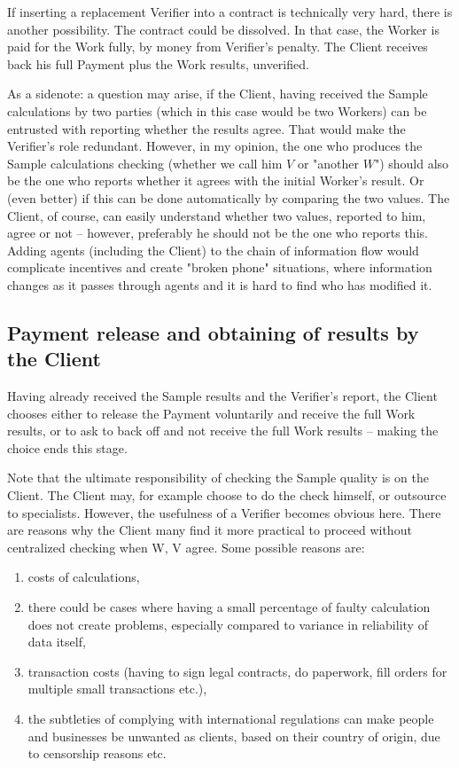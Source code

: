 \documentclass{article}
\providecommand{\tightlist}{%
  \setlength{\itemsep}{0pt}%
  \setlength{\parskip}{0pt}%
  \setlength{\topsep}{0pt}}
\begin{document}
If inserting a replacement Verifier into a contract is technically very hard, there is another possibility. The contract could be dissolved. In that case, the Worker is paid for the Work fully, by money from Verifier's penalty. The Client receives back his full Payment plus the Work results, unverified. 

As a sidenote: a question may arise, if the Client, having received the Sample calculations by two parties (which in this case would be two Workers) can be entrusted with reporting whether the results agree. That would make the Verifier's role redundant. However, in my opinion, the one who produces the Sample calculations checking (whether we call him $V$ or "another $W$") should also be the one who reports whether it agrees with the initial Worker's result. Or (even better) if this can be done automatically by comparing the two values. The Client, of course, can easily understand whether two values, reported to him, agree or not – however, preferably he should not be the one who reports this. Adding agents (including the Client) to the chain of information flow would complicate incentives and create "broken phone" situations, where information changes as it passes through agents and it is hard to find who has modified it.

\subsection{Payment release and obtaining of results by the Client}
\label{results}

Having already received the Sample results and the Verifier's report, the Client chooses either to release the Payment voluntarily and receive the full Work results, or to ask to back off and not receive the full Work results – making the choice ends this stage. 

Note that the ultimate responsibility of checking the Sample quality is on the Client. The Client may, for example choose to do the check himself, or outsource to specialists. However, the usefulness of a Verifier becomes obvious here. There are reasons why the Client many find it more practical to proceed without centralized checking when W, V agree. Some possible reasons are: 
\renewcommand{\labelenumi}{(\alph{enumi})}
\begin{enumerate}[topsep=0pt]
    \tightlist
    \item costs of calculations,
    \item there could be cases where having a small percentage of faulty calculation does not create problems, especially compared to variance in reliability of data itself,
    \item transaction costs (having to sign legal contracts, do paperwork, fill orders for multiple small transactions etc.),
    \item the subtleties of complying with international regulations can make people and businesses be unwanted as clients, based on their country of origin, due to censorship reasons etc. 
\end{enumerate}
\end{document}
